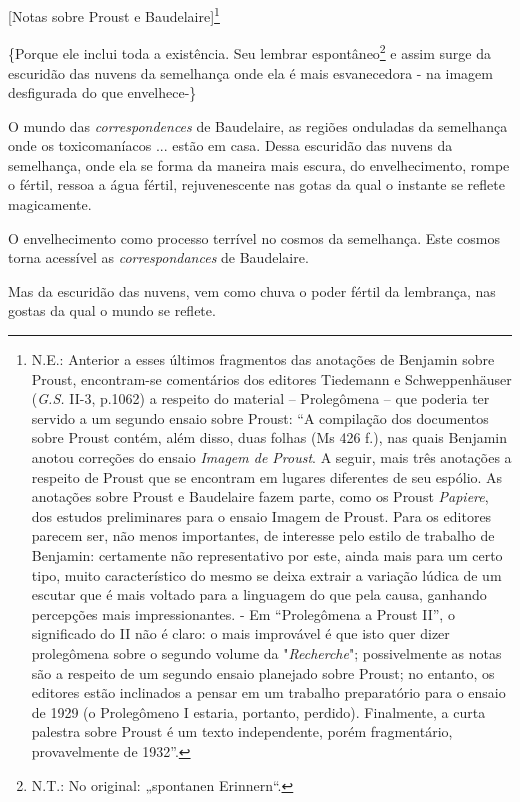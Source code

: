 {[}Notas sobre Proust e Baudelaire{]}\footnote{N.E.: Anterior a esses
  últimos fragmentos das anotações de Benjamin sobre Proust,
  encontram-se comentários dos editores Tiedemann e Schweppenhäuser
  (\emph{G.S.} II-3, p.1062) a respeito do material -- Prolegômena --
  que poderia ter servido a um segundo ensaio sobre Proust: ``A
  compilação dos documentos sobre Proust contém, além disso, duas folhas
  (Ms 426 f.), nas quais Benjamin anotou correções do ensaio
  \emph{Imagem de Proust}. A seguir, mais três anotações a respeito de
  Proust que se encontram em lugares diferentes de seu espólio. As
  anotações sobre Proust e Baudelaire fazem parte, como os Proust
  \emph{Papiere}, dos estudos preliminares para o ensaio Imagem de
  Proust. Para os editores parecem ser, não menos importantes, de
  interesse pelo estilo de trabalho de Benjamin: certamente não
  representativo por este, ainda mais para um certo tipo, muito
  característico do mesmo se deixa extrair a variação lúdica de um
  escutar que é mais voltado para a linguagem do que pela causa,
  ganhando percepções mais impressionantes. - Em ``Prolegômena a Proust
  II'', o significado do II não é claro: o mais improvável é que isto
  quer dizer prolegômena sobre o segundo volume da "\emph{Recherche}";
  possivelmente as notas são a respeito de um segundo ensaio planejado
  sobre Proust; no entanto, os editores estão inclinados a pensar em um
  trabalho preparatório para o ensaio de 1929 (o Prolegômeno I estaria,
  portanto, perdido). Finalmente, a curta palestra sobre Proust é um
  texto independente, porém fragmentário, provavelmente de 1932''.}

\{Porque ele inclui toda a existência. Seu lembrar espontâneo\footnote{N.T.:
  No original: „spontanen Erinnern``.} e assim surge da escuridão das
nuvens da semelhança onde ela é mais esvanecedora - na imagem
desfigurada do que envelhece-\}

O mundo das \emph{correspondences} de Baudelaire, as regiões onduladas
da semelhança onde os toxicomaníacos ... estão em casa. Dessa escuridão
das nuvens da semelhança, onde ela se forma da maneira mais escura, do
envelhecimento, rompe o fértil, ressoa a água fértil, rejuvenescente nas
gotas da qual o instante se reflete magicamente.

O envelhecimento como processo terrível no cosmos da semelhança. Este
cosmos torna acessível as \emph{correspondances} de Baudelaire.

Mas da escuridão das nuvens, vem como chuva o poder fértil da lembrança,
nas gostas da qual o mundo se reflete.

